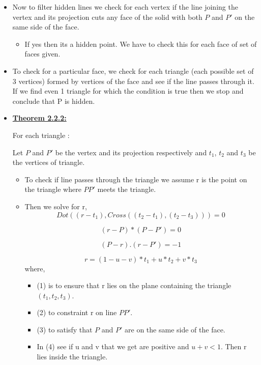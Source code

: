 \documentclass[12pt]{article}
\begin{document}
\begin{itemize}
    \item Now to filter hidden lines we check for each vertex if the line joining the vertex and its projection cuts any face of the solid with both $P$ and $P'$ on the same side of the face.
    \begin{itemize}
        \item If yes then its a hidden point. We have to check this for each face of set of faces given.

    \end{itemize}
    \item To check for a particular face, we check for each triangle (each possible set of 3 vertices) formed by vertices of the face and see if the line passes through it. If we find even 1 triangle for which the condition is true then we stop and conclude that P is hidden.
    
    \item \textbf{{\underline{Theorem 2.2.2:}}}
    
    
    For each triangle :
    
    Let $P$ and $P'$ be the vertex and its projection respectively and $t_1$, $t_2$ and $t_3$ be the vertices of triangle.
    \begin{itemize}
        \item To check if line passes through the triangle we assume r is the point on the triangle where $PP'$ meets the triangle.
        
        \item Then we solve for r,
        \begin{equation}
            Dot((r - t_1) ,Cross((t_2 - t_1), (t_2 - t_3))) = 0
        \end{equation} 
        
        
	    \begin{equation}
	        (r - P) * (P - P') = 0 
	    \end{equation}
	    
	    
	    \begin{equation}
	        (P - r).(r - P') = -1
	    \end{equation}
	    
	    
	    \begin{equation}
	        r = (1 - u - v) * t_1 + u * t_2 + v * t_3
	    \end{equation}
	    where,
	    \begin{itemize}
	        \item (1) is to ensure that r lies on the plane containing the triangle $ (t_1, t_2, t_3) $.
	        \item (2) to constraint r on line $PP'$.
	        \item (3) to satisfy that $P$ and $P'$ are on the same side of the face.
	        \item In (4) see if u and v that we get are positive and $ u + v < 1$. Then r lies inside the triangle.


\end{itemize}
\end{itemize}
\end{itemize}
\end{document}
